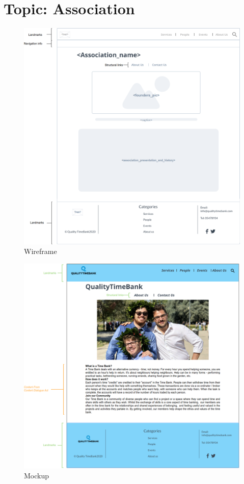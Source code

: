 \documentclass[a4paper, 11pt, parskip=half, headsepline]{scrreprt}
\begin{document}
\section{Topic: Association}

\begin{figure}[H]
    \centering
    \includegraphics[width=1\linewidth, keepaspectratio]{wireframes/Topic-AboutUs}
    \caption{Wireframe}
\end{figure}

\begin{figure}[H]
    \centering
    \includegraphics[width=1\linewidth, keepaspectratio]{mockups/About_Us}
    \caption{Mockup}
\end{figure}
\end{document}
